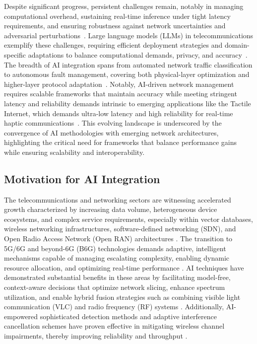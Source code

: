 \documentclass[sigconf]{acmart}
\begin{document}
Despite significant progress, persistent challenges remain, notably in managing computational overhead, sustaining real-time inference under tight latency requirements, and ensuring robustness against network uncertainties and adversarial perturbations~\cite{ref7,ref8,ref9}. Large language models (LLMs) in telecommunications exemplify these challenges, requiring efficient deployment strategies and domain-specific adaptations to balance computational demands, privacy, and accuracy~\cite{ref7}. The breadth of AI integration spans from automated network traffic classification to autonomous fault management, covering both physical-layer optimization and higher-layer protocol adaptation~\cite{ref10,ref49,ref50}. Notably, AI-driven network management requires scalable frameworks that maintain accuracy while meeting stringent latency and reliability demands intrinsic to emerging applications like the Tactile Internet, which demands ultra-low latency and high reliability for real-time haptic communications~\cite{ref10}. This evolving landscape is underscored by the convergence of AI methodologies with emerging network architectures, highlighting the critical need for frameworks that balance performance gains while ensuring scalability and interoperability.

\subsection{Motivation for AI Integration}

The telecommunications and networking sectors are witnessing accelerated growth characterized by increasing data volume, heterogeneous device ecosystems, and complex service requirements, especially within vector databases, wireless networking infrastructures, software-defined networking (SDN), and Open Radio Access Network (Open RAN) architectures \cite{ref21,ref22,ref23}. The transition to 5G/6G and beyond-6G (B6G) technologies demands adaptive, intelligent mechanisms capable of managing escalating complexity, enabling dynamic resource allocation, and optimizing real-time performance \cite{ref24,ref25}. AI techniques have demonstrated substantial benefits in these areas by facilitating model-free, context-aware decisions that optimize network slicing, enhance spectrum utilization, and enable hybrid fusion strategies such as combining visible light communication (VLC) and radio frequency (RF) systems \cite{ref51,ref52}. Additionally, AI-empowered sophisticated detection methods and adaptive interference cancellation schemes have proven effective in mitigating wireless channel impairments, thereby improving reliability and throughput \cite{ref54,ref55}.
\end{document}
